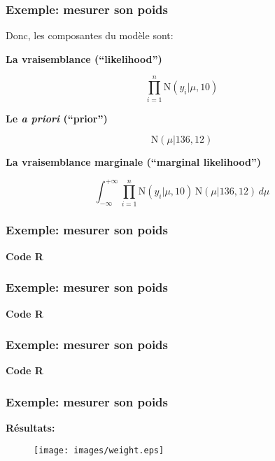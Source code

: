 \documentclass{beamer}
\begin{document}
\begin{frame}
    \frametitle{Exemple: mesurer son poids}
    Donc, les composantes du modèle sont:

    \pause

    \vfill

    \textbf{La vraisemblance (``likelihood'')}

    \[\prod_{i=1}^{n} \textrm{N}(y_i | \mu, 10)\]

    \pause

    \vfill

    \textbf{Le \emph{a priori} (``prior'')}

    \[\textrm{N}(\mu | 136, 12)\]

    \pause

    \vfill

    \textbf{La vraisemblance marginale (``marginal likelihood'')}

    \[\int_{-\infty}^{+\infty} \prod_{i=1}^{n} \textrm{N}(y_i | \mu, 10) \, \textrm{N}(\mu | 136, 12) \, d\mu\]
\end{frame}


\begin{frame}[fragile]
    \frametitle{Exemple: mesurer son poids}
    \textbf{Code R}
    \fontsize{9}{11}\selectfont
    
\end{frame}


\begin{frame}[fragile]
    \frametitle{Exemple: mesurer son poids}
    \textbf{Code R}
    \fontsize{9}{11}\selectfont
    
\end{frame}


\begin{frame}[fragile]
    \frametitle{Exemple: mesurer son poids}
    \textbf{Code R}
    \fontsize{9}{11}\selectfont
    
\end{frame}


\begin{frame}
    \frametitle{Exemple: mesurer son poids}
    \textbf{Résultats:}
    \begin{figure}
      \centering
      \texttt{[image: images/weight.eps]}
    \end{figure}
\end{frame}
\end{document}
